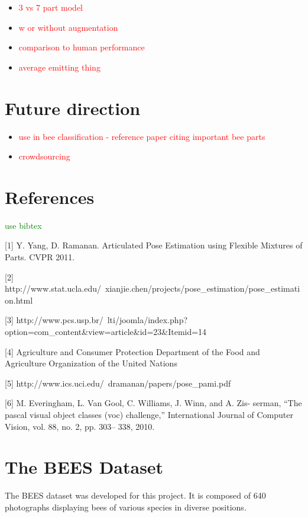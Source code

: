 \documentclass[11pt, oneside]{report}
\newcommand{\comment}[1]{\textcolor{red}{#1}}
\newcommand{\pcomment}[1]{\textcolor{green}{#1}}
\begin{document}
    \begin{itemize}
    \item
        \comment{3 vs 7 part model}
    \item
        \comment{w or without augmentation}
    \item
        \comment{comparison to human performance}
    \item
        \comment{average emitting thing}
    \end{itemize}

\chapter{Future direction}
    \begin{itemize}
    \item
        \comment{use in bee classification - reference paper citing important bee parts}
    \item
        \comment{crowdsourcing}
    \end{itemize}

\chapter{References}
\pcomment{use bibtex}

[1] Y. Yang, D. Ramanan. Articulated Pose Estimation using Flexible Mixtures of Parts. CVPR 2011.

[2] http://www.stat.ucla.edu/~xianjie.chen/projects/pose\_estimation/pose\_estimation.html

[3] http://www.pcs.usp.br/~lti/joomla/index.php?option=com\_content\&view=article\&id=23\&Itemid=14

[4] Agriculture and Consumer Protection Department of the Food and Agriculture Organization of the United Nations

[5] http://www.ics.uci.edu/~dramanan/papers/pose\_pami.pdf

[6] M. Everingham, L. Van Gool, C. Williams, J. Winn, and A. Zis- serman, “The pascal visual object classes (voc) challenge,”
International Journal of Computer Vision, vol. 88, no. 2, pp. 303–
338, 2010.



\appendix
\chapter{The BEES Dataset}
    The BEES dataset was developed for this project. It is composed of 640 photographs displaying bees of various species in diverse positions.
\end{document}
